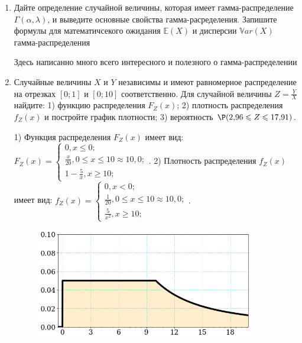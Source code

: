 \documentclass[a4paper,14pt]{article}
\begin{document}
\begin{enumerate}


\item

Дайте определение случайной величины, которая имеет гамма-распределение $\Gamma(\alpha,  \lambda)$, и выведите основные свойства гамма-расределения. Запишите формулы для математичсекого ожидания
$\mathbb{E}(X)$ и дисперсии $\mathbb{V}ar(X)$ гамма-распределения




Здесь написанно много всего интересного и полезного о гамма-распределении


\item



Случайные величины $X$ и $Y$ независимы и имеют равномерное
распределение на отрезках $[0;1]$ и $[0;10]$ соответственно. Для случайной величины $Z=\frac{Y}{X}$ найдите: 
1) функцию распределения $F_Z(x)$;
2) плотность распределения $f_Z(x)$ и постройте график плотности;
3) вероятность $\P(2,\!96\leqslant Z\leqslant 17,\!91)$.




1) Функция распределения $F_Z(x)$ имеет вид:
$
F_Z(x)=\left\{
\begin{array}{l}
0, x\leqslant 0;\\
\frac{x}{20}, 0\leqslant x\leqslant 10\approx 10,\!0;\\
1 - \frac{5}{x}, x\geqslant10;
\end{array}.
\right.
$
2) Плотность распределения $f_Z(x)$ имеет вид:
$
f_Z(x)=\left\{
\begin{array}{l}
0, x<0;\\
\frac{1}{20}, 0\leqslant x\leqslant 10\approx 10,\!0;\\
\frac{5}{x^{2}}, x\geqslant10;
\end{array}.
\right.
$


\begin{figure}[H]
    \includegraphics[width=0.9\textwidth]{2_53d13}
\end{figure}



\end{enumerate}
\end{document}
